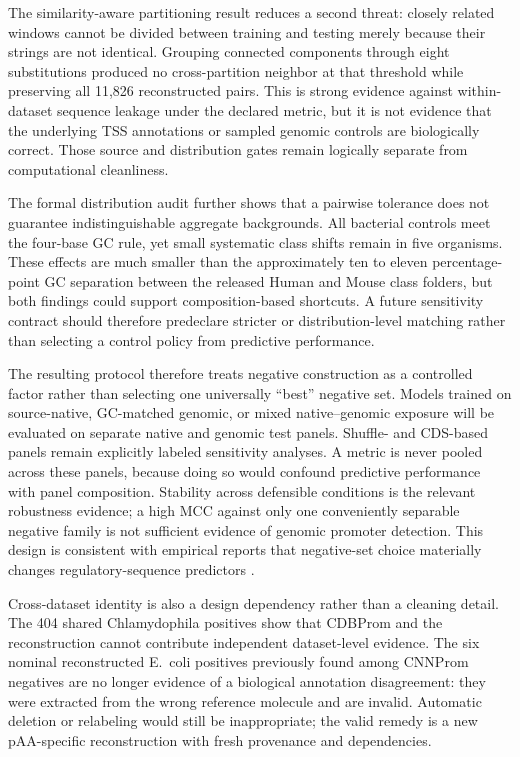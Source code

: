 The similarity-aware partitioning result reduces a second threat: closely
related windows cannot be divided between training and testing merely because
their strings are not identical. Grouping connected components through eight
substitutions produced no cross-partition neighbor at that threshold while
preserving all 11,826 reconstructed pairs. This is strong evidence against
within-dataset sequence leakage under the declared metric, but it is not
evidence that the underlying TSS annotations or sampled genomic controls are
biologically correct. Those source and distribution gates remain logically
separate from computational cleanliness.

The formal distribution audit further shows that a pairwise tolerance does not
guarantee indistinguishable aggregate backgrounds. All bacterial controls meet
the four-base GC rule, yet small systematic class shifts remain in five
organisms. These effects are much smaller than the approximately ten to eleven
percentage-point GC separation between the released Human and Mouse class
folders, but both findings could support composition-based shortcuts. A future
sensitivity contract should therefore predeclare stricter or distribution-level
matching rather than selecting a control policy from predictive performance.

The resulting protocol therefore treats negative construction as a controlled
factor rather than selecting one universally ``best'' negative set. Models
trained on source-native, GC-matched genomic, or mixed native--genomic exposure
will be evaluated on separate native and genomic test panels. Shuffle- and
CDS-based panels remain explicitly labeled sensitivity analyses. A metric is
never pooled across these panels, because doing so would confound predictive
performance with panel composition. Stability across defensible conditions is
the relevant robustness evidence; a high MCC against only one conveniently
separable negative family is not sufficient evidence of genomic promoter
detection. This design is consistent with empirical reports that negative-set
choice materially changes regulatory-sequence predictors
\citep{gonzalez2025negative,krutzfeldt2020impact}.

Cross-dataset identity is also a design dependency rather than a cleaning
detail. The 404 shared Chlamydophila positives show that CDBProm and the
reconstruction cannot contribute independent dataset-level evidence. The six
nominal reconstructed E.~coli positives previously found among CNNProm
negatives are no longer evidence of a biological annotation disagreement: they
were extracted from the wrong reference molecule and are invalid. Automatic
deletion or relabeling would still be inappropriate; the valid remedy is a new
pAA-specific reconstruction with fresh provenance and dependencies.

